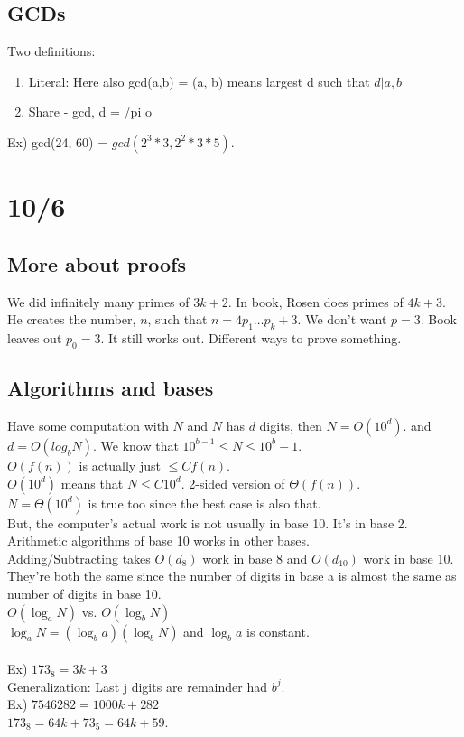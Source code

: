 \documentclass[13pt]{article}
\begin{document}
	\subsection*{GCDs}
		Two definitions:
		\begin{enumerate}
			\item Literal: Here also gcd(a,b) = (a, b) means largest d such that
				$d | a,b$\\
			\item Share - gcd, d = /pi o
		\end{enumerate}
	  Ex) gcd(24, 60) = $gcd(2^3* 3 ,2^2*3*5)$.

\section*{10/6}
	\subsection*{More about proofs}
	We did infinitely many primes of $3k + 2$. In book, Rosen does primes of
	$4k + 3$. He creates the number, $n$, such that $n = 4p_1\ldots p_k + 3$.
	We don't want $p = 3$. Book leaves out $p_0 = 3$. It still works out. 
	Different ways to prove something.\\

	\subsection*{Algorithms and bases}
	Have some computation with $N$ and $N$ has $d$ digits, then $N = O(10^d)$.
	and $d = O(log_b{N})$. We know that $10^{b - 1} \le N \le 10^{b} - 1$.\\
	$O(f(n))$ is actually just $\le Cf(n)$. \\
	$O(10^d)$ means that $N \le C10^d$. 2-sided version of $\Theta(f(n))$. \\
	$N = \Theta(10^d)$ is true too since the best case is also that.\\
	But, the computer's actual work is not usually in base 10. It's in base 2.
	Arithmetic algorithms of base 10 works in other bases.\\
	Adding/Subtracting takes $O(d_8)$ work in base 8 and $O(d_10)$ work in base
	10. They're both the same since the number of digits in base a is almost
	the same as number of digits in base 10. \\
	$O(\log_a N)$ vs. $ O(\log_b N)$\\
	$\log_a N = (\log_b a) (\log_b N)$ and $\log_b a$ is constant. \\\\
	Ex) $173_8 = 3k + 3$ \\
	Generalization: Last j digits are remainder had $b^j$.\\
	Ex) $7546282 = 1000k + 282$\\
	$173_8 = 64k + 73_5 = 64k + 59$.
\end{document}
